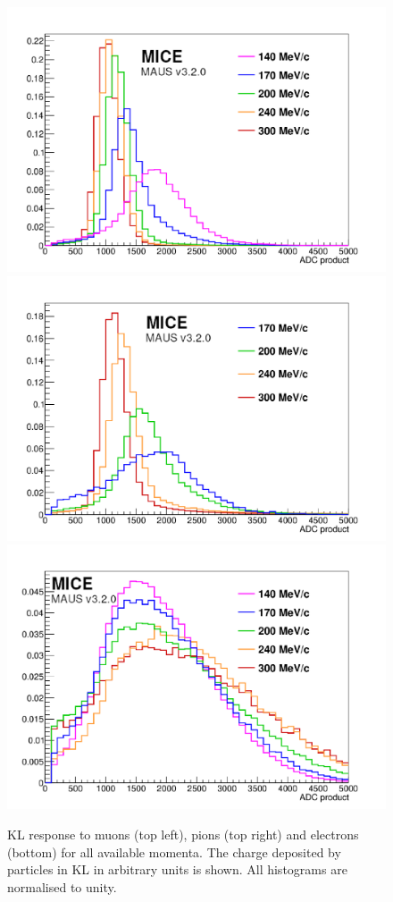 \begin{figure}
  \begin{center}
    \includegraphics[width=0.45\columnwidth]{./04-KL/Figures/muon.pdf}
    \includegraphics[width=0.45\columnwidth]{./04-KL/Figures/pion.pdf}
    \includegraphics[width=0.45\columnwidth]{./04-KL/Figures/electron.pdf}
  \end{center}
  \caption{
    KL response to muons (top left), pions (top right) and electrons
    (bottom) for all available momenta.
    The charge deposited by particles in KL in arbitrary units is
    shown.
    All histograms are normalised to unity.
  }
  \label{fig:KL3}
\end{figure}
  
